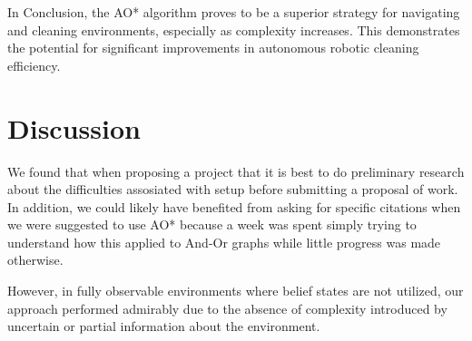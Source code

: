\documentclass{article}
\begin{document}
In Conclusion, the AO* algorithm proves to be a superior strategy for navigating and cleaning environments, especially as complexity increases. This demonstrates the potential for significant improvements in autonomous robotic cleaning efficiency.


\section{Discussion}
We found that when proposing a project that it is best to do preliminary research about the difficulties assosiated with setup before submitting a proposal of work. In addition, we could likely have benefited from asking for specific citations when we were suggested to use AO* because a week was spent simply trying to understand how this applied to And-Or graphs while little progress was made otherwise. 

However, in fully observable environments where belief states are not utilized, our approach performed admirably due to the absence of complexity introduced by uncertain or partial information about the environment.
\end{document}

